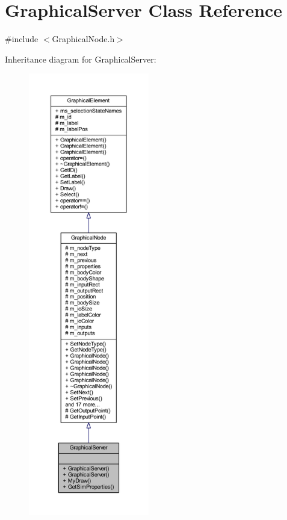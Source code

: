 \hypertarget{class_graphical_server}{}\section{Graphical\+Server Class Reference}
\label{class_graphical_server}


{\ttfamily \#include $<$Graphical\+Node.\+h$>$}



Inheritance diagram for Graphical\+Server\+:
\nopagebreak
\begin{figure}[H]
\begin{center}
\leavevmode
\includegraphics[height=550pt]{class_graphical_server__inherit__graph}
\end{center}
\end{figure}


